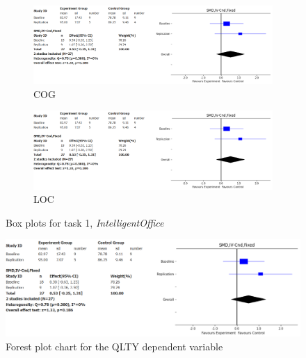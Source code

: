 \begin{figure}[htbp]
    \medskip

    \begin{subfigure}{0.5\textwidth}
        \includegraphics[width=\linewidth]{figures/forest_plots/QLTY.png}
        \caption{COG}
        \label{bp_task1_cog}
    \end{subfigure}\hfil
    \begin{subfigure}{0.5\textwidth}
        \includegraphics[width=\linewidth]{figures/forest_plots/QLTY.png}
        \caption{LOC}
        \label{bp_task1_loc}
    \end{subfigure}
    \caption{Box plots for task 1, \textit{IntelligentOffice}}
    \label{box_plots_task1}
\end{figure}

\begin{figure}[H]
    \centering
    \includegraphics[width=\linewidth]{figures/forest_plots/QLTY.png}
    \caption{Forest plot chart for the QLTY dependent variable}
    \label{forest_plot}
\end{figure}



